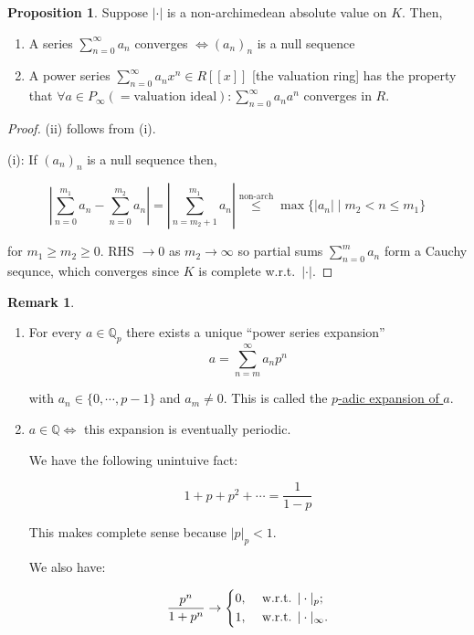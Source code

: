 \documentclass[openany]{amsbook}
\numberwithin{section}{chapter}
\theoremstyle{definition}
\newtheorem*{remark}{Remark}
\newtheorem{proposition}[theorem]{Proposition}
\begin{document}
\begin{proposition}
    Suppose \(\vert \cdot \vert\) is a non-archimedean absolute value on \(K\). Then,

    \begin{enumerate}[label=\roman*)]
        \item A series \(\sum_{n=0}^{\infty} a_n\) converges \(\iff (a_n)_n\) is a null sequence
        \item A power series \(\sum_{n=0}^{\infty} a_n x^n \in R[[x]]\) [the valuation ring] has the property that \(\forall a\in P_\infty(=\text{valuation ideal}): \sum_{n=0}^{\infty} a_n a^n\) converges in \(R\).  
    \end{enumerate} 
\end{proposition}

\begin{proof}
    (ii) follows from (i).

    (i): If \((a_n)_n\) is a null sequence then,
    
    \[
        \left\vert \sum_{n=0}^{m_1} a_n - \sum_{n=0}^{m_2} a_n \right\vert = \left\vert \sum_{n=m_2 + 1}^{m_1} a_n \right\vert \overset{\text{non-arch}}{\leq} \max \{ \vert a_n \vert \mid m_2 < n \leq m_1 \} 
    \]

    for \(m_1 \geq m_2 \geq 0\). RHS \(\to 0\) as \(m_2 \to \infty\) so partial sums \(\sum_{n=0}^{m} a_n\) form a Cauchy sequnce, which converges since \(K\) is complete w.r.t.\ \(\vert \cdot \vert\).
\end{proof}

\begin{remark}
    \begin{enumerate}[label=\roman*)]
        \item For every \(a\in \mathbb{Q}_p\) there exists a unique ``power series expansion''
        \[
            a = \sum_{n=m}^{\infty} a_n p^n
        \]

        with \(a_n \in \{ 0, \cdots , p-1 \}\) and \(a_m \neq 0\). This is called the \underline{\(p\)-adic expansion of \(a\)}.

        \item \(a\in \mathbb{Q} \iff\) this expansion is eventually periodic.
        
        We have the following unintuive fact:
        
        \[
            1 + p + p^2 + \cdots = \frac{1}{1-p}
        \]

        This makes complete sense because \(\vert p \vert_p < 1\).

        We also have:

        \[
            \frac{p^n}{1 + p^n} \to \begin{dcases}
                0, &\text{ w.r.t. } \vert \cdot \vert_p ;\\
                1, &\text{ w.r.t. } \vert \cdot \vert_\infty .
            \end{dcases}
        \]
    \end{enumerate} 
\end{remark}
\end{document}
